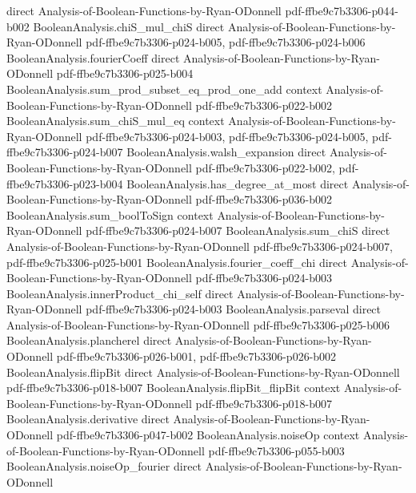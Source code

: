 \begin{lemma}
  {direct}
  {Analysis-of-Boolean-Functions-by-Ryan-ODonnell}
  {pdf-ffbe9c7b3306-p044-b002}
\proofstep
  {BooleanAnalysis.chiS_mul_chiS}
  {direct}
  {Analysis-of-Boolean-Functions-by-Ryan-ODonnell}
  {pdf-ffbe9c7b3306-p024-b005,
    pdf-ffbe9c7b3306-p024-b006}
\proofstep
  {BooleanAnalysis.fourierCoeff}
  {direct}
  {Analysis-of-Boolean-Functions-by-Ryan-ODonnell}
  {pdf-ffbe9c7b3306-p025-b004}
\proofstep
  {BooleanAnalysis.sum_prod_subset_eq_prod_one_add}
  {context}
  {Analysis-of-Boolean-Functions-by-Ryan-ODonnell}
  {pdf-ffbe9c7b3306-p022-b002}
\proofstep
  {BooleanAnalysis.sum_chiS_mul_eq}
  {context}
  {Analysis-of-Boolean-Functions-by-Ryan-ODonnell}
  {pdf-ffbe9c7b3306-p024-b003,
    pdf-ffbe9c7b3306-p024-b005,
    pdf-ffbe9c7b3306-p024-b007}
\proofstep
  {BooleanAnalysis.walsh_expansion}
  {direct}
  {Analysis-of-Boolean-Functions-by-Ryan-ODonnell}
  {pdf-ffbe9c7b3306-p022-b002,
    pdf-ffbe9c7b3306-p023-b004}
\proofstep
  {BooleanAnalysis.has_degree_at_most}
  {direct}
  {Analysis-of-Boolean-Functions-by-Ryan-ODonnell}
  {pdf-ffbe9c7b3306-p036-b002}
\proofstep
  {BooleanAnalysis.sum_boolToSign}
  {context}
  {Analysis-of-Boolean-Functions-by-Ryan-ODonnell}
  {pdf-ffbe9c7b3306-p024-b007}
\proofstep
  {BooleanAnalysis.sum_chiS}
  {direct}
  {Analysis-of-Boolean-Functions-by-Ryan-ODonnell}
  {pdf-ffbe9c7b3306-p024-b007,
    pdf-ffbe9c7b3306-p025-b001}
\proofstep
  {BooleanAnalysis.fourier_coeff_chi}
  {direct}
  {Analysis-of-Boolean-Functions-by-Ryan-ODonnell}
  {pdf-ffbe9c7b3306-p024-b003}
\proofstep
  {BooleanAnalysis.innerProduct_chi_self}
  {direct}
  {Analysis-of-Boolean-Functions-by-Ryan-ODonnell}
  {pdf-ffbe9c7b3306-p024-b003}
\proofstep
  {BooleanAnalysis.parseval}
  {direct}
  {Analysis-of-Boolean-Functions-by-Ryan-ODonnell}
  {pdf-ffbe9c7b3306-p025-b006}
\proofstep
  {BooleanAnalysis.plancherel}
  {direct}
  {Analysis-of-Boolean-Functions-by-Ryan-ODonnell}
  {pdf-ffbe9c7b3306-p026-b001,
    pdf-ffbe9c7b3306-p026-b002}
\proofstep
  {BooleanAnalysis.flipBit}
  {direct}
  {Analysis-of-Boolean-Functions-by-Ryan-ODonnell}
  {pdf-ffbe9c7b3306-p018-b007}
\proofstep
  {BooleanAnalysis.flipBit_flipBit}
  {context}
  {Analysis-of-Boolean-Functions-by-Ryan-ODonnell}
  {pdf-ffbe9c7b3306-p018-b007}
\proofstep
  {BooleanAnalysis.derivative}
  {direct}
  {Analysis-of-Boolean-Functions-by-Ryan-ODonnell}
  {pdf-ffbe9c7b3306-p047-b002}
\proofstep
  {BooleanAnalysis.noiseOp}
  {context}
  {Analysis-of-Boolean-Functions-by-Ryan-ODonnell}
  {pdf-ffbe9c7b3306-p055-b003}
\proofstep
  {BooleanAnalysis.noiseOp_fourier}
  {direct}
  {Analysis-of-Boolean-Functions-by-Ryan-ODonnell}

\end{lemma}
